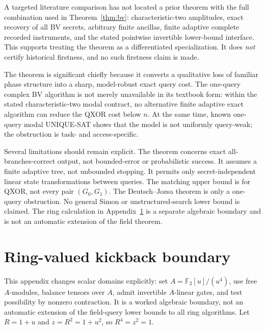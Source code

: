 \documentclass[11pt]{article}
\newcommand{\F}{\mathbb F}
\newcommand{\A}{\F_2[u]/(u^4)}
\begin{document}
A targeted literature comparison has not located a prior theorem with the full combination used in Theorem~\ref{thm:bv}: characteristic-two amplitudes, exact recovery of all BV secrets, arbitrary finite ancillas, finite adaptive complete recorded instruments, and the stated pointwise invertible lower-bound interface. This supports treating the theorem as a differentiated specialization. It does \emph{not} certify historical firstness, and no such firstness claim is made.

The theorem is significant chiefly because it converts a qualitative loss of familiar phase structure into a sharp, model-robust exact query cost. The one-query complex BV algorithm is not merely unavailable in its textbook form: within the stated characteristic-two modal contract, no alternative finite adaptive exact algorithm can reduce the QXOR cost below $n$. At the same time, known one-query modal UNIQUE-SAT \cite{WillcockSabry2011} shows that the model is not uniformly query-weak; the obstruction is task- and access-specific.

Several limitations should remain explicit. The theorem concerns exact all-branches-correct output, not bounded-error or probabilistic success. It assumes a finite adaptive tree, not unbounded stopping. It permits only secret-independent linear state transformations between queries. The matching upper bound is for QXOR, not every pair $(G_0,G_1)$. The Deutsch--Jozsa theorem is only a one-query obstruction. No general Simon or unstructured-search lower bound is claimed. The ring calculation in Appendix~\ref{sec:phase} is a separate algebraic boundary and is not an automatic extension of the field theorem.

\appendix
\section{Ring-valued kickback boundary}\label{sec:phase}
This appendix changes scalar domains explicitly: set $A=\A$, use free $A$-modules, balance tensors over $A$, admit invertible $A$-linear gates, and test possibility by nonzero contraction. It is a worked algebraic boundary, not an automatic extension of the field-query lower bounds to all ring algorithms. Let $R=1+u$ and $z=R^2=1+u^2$, so $R^4=z^2=1$.
\end{document}
